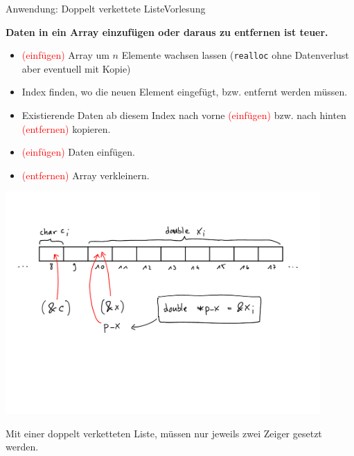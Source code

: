 \documentclass[xcolor=dvipsnames]{beamer}
\newcounter{lecturecounter}
\begin{document}
\begin{frame}[fragile]{Anwendung: Doppelt verkettete Liste}{Vorlesung }
\begin{block}{}
  \textbf{Daten in ein Array einzufügen oder daraus zu entfernen ist teuer.}
  \begin{itemize}
    \item{\textcolor{red}{(einfügen)} Array um $n$ Elemente wachsen lassen (\verb|realloc| ohne Datenverlust aber eventuell mit Kopie)}
    \item{\hspace{1.5cm} Index finden, wo die neuen Element eingefügt, bzw. entfernt werden müssen.}
    \item{\hspace{1.5cm} Existierende Daten ab diesem Index nach vorne \textcolor{red}{(einfügen)} bzw. nach hinten \textcolor{red}{(entfernen)} kopieren.}
    \item{\textcolor{red}{(einfügen)} Daten einfügen.}
    \item{\textcolor{red}{(entfernen)} Array verkleinern.}
  \end{itemize}
\end{block}
\centering
\includegraphics[width=0.9\textwidth,page=7,trim=0 8.2cm 0 7cm,clip=true]{graphics/c_kurs_tafel}
\begin{block}{}
  Mit einer doppelt verketteten Liste, müssen nur jeweils zwei Zeiger gesetzt werden.
\end{block}
\end{frame}
\end{document}
